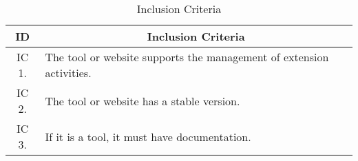 \begin{table}[!htb]
  \centering
  \caption{Inclusion Criteria}
  \label{tbl:gl-inclusion-criteria}
  \footnotesize
  \begin{tabular}{c|l}
    \bottomrule
    \rowcolor[rgb]{0.753,0.753,0.753} \textbf{ID} & \multicolumn{1}{c}{\textbf{Inclusion Criteria}}                      \\
    \hline
    \rowcolor[HTML]{DEDEDE}
    IC 1.                                         & The tool or website supports the management of extension activities. \\
    IC 2.                                         & The tool or website has a stable version.                            \\
    \rowcolor[HTML]{DEDEDE}
    IC 3.                                         & If it is a tool, it must have documentation.                         \\
    \toprule
  \end{tabular}
\end{table}